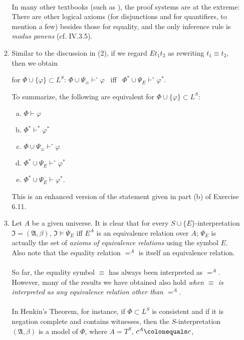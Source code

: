 \begin{enumerate}[1.]
\begin{enumerate}[(1)]
\ \\
In many other textbooks (such as \cite{Christos_Papadimitriou}), the proof systems are at the extreme: There are other logical axioms (for disjunctions and for quantifiers, to mention a few) besides those for equality, and the only inference rule is \emph{modus ponens} (cf. IV.3.5).
\item Similar to the discussion in (2), if we regard $E t_1 t_2$ as rewriting $t_1 \equiv t_2$, then we obtain
\begin{center}
for $\Phi \cup \{ \varphi \} \subset L^S$: $\Phi \cup \Psi_\equiv \vdash^\circ \varphi$ \ iff \ $\Phi^\ast \cup \Psi_E \vdash^\circ \varphi^\ast$.
\end{center}
To summarize, the following are equivalent for $\Phi \cup \{ \varphi \} \subset L^S$:
\begin{enumerate}[(a)]
\item $\Phi \vdash \varphi$
\item $\Phi^\ast \vdash^\ast \varphi^\ast$
\item $\Phi \cup \Psi_\equiv \vdash^\circ \varphi$
\item $\Phi^\ast \cup \Psi_E \vdash^\circ \varphi^\ast$
\item $\Phi^\ast \cup \Psi_E \vdash \varphi^\ast$.
\end{enumerate}
This is an enhanced version of the statement given in part (b) of Exercise 6.11.
\item Let $A$ be a given universe. It is clear that for every $S \cup \{ E \}$-interpretation $\mathfrak{I} = (\mathfrak{A}, \beta)$, $\mathfrak{I} \models \Psi_E$ iff $E^A$ is an equivalence relation over $A$; $\Psi_E$ is actually the set of \emph{axioms of equivalence relations} using the symbol $E$. Also note that the equality relation $=^A$ is itself an equivalence relation.\\
\ \\
So far, the equality symbol $\equiv$ has always been interpreted as $=^A$. However, many of the results we have obtained also hold \emph{when $\equiv$ is interpreted as any equivalence relation other than $=^A$}.\\
\ \\
In Henkin's Theorem, for instance, if $\Phi \subset L^S$ is consistent and if it is negation complete and contains witnesses, then the $S$-interpretation $(\mathfrak{A}, \beta)$ is a model of $\Phi$, where $A = T^S$, $c^A \colonequals c$,
\begin{center}
\begin{tabular}{lll}

\end{tabular}
\end{center}
\end{enumerate}
\end{enumerate}
